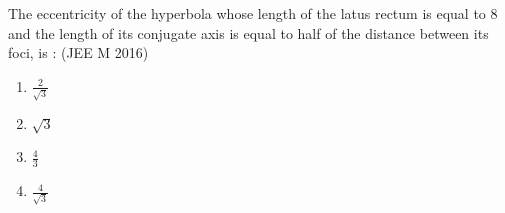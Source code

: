     \item The eccentricity of the hyperbola whose length of the latus rectum is equal to $8$ and the length of its conjugate axis is equal to half of the distance between its foci, is :
    \hfill(JEE M 2016)
    \begin{enumerate}
    \item$\frac{2}{\sqrt{3}}$
    \item$\sqrt{3}$
    \item$\frac{4}{3}$
    \item$\frac{4}{\sqrt{3}}$
    \end{enumerate}

